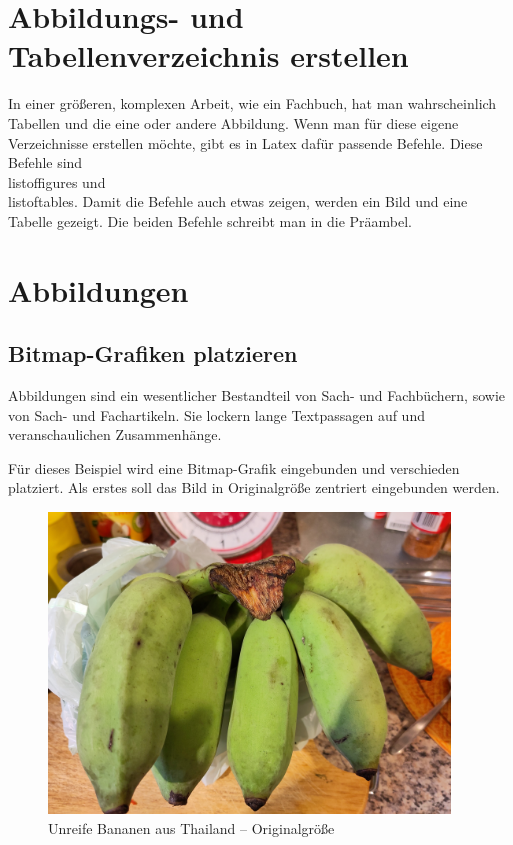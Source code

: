 \section{Abbildungs- und Tabellenverzeichnis erstellen}

In einer größeren, komplexen Arbeit, wie ein Fachbuch, hat man wahrscheinlich Tabellen und die eine oder andere Abbildung. Wenn man für diese eigene Verzeichnisse erstellen möchte, gibt es in Latex dafür passende Befehle. Diese Befehle sind \\listoffigures und \\listoftables. Damit die Befehle auch etwas zeigen, werden ein Bild und eine Tabelle gezeigt. Die beiden Befehle schreibt man in die Präambel.

\section{Abbildungen}

\subsection{Bitmap-Grafiken platzieren}

Abbildungen sind ein wesentlicher Bestandteil von Sach- und Fachbüchern, sowie von Sach- und Fachartikeln. Sie lockern lange Textpassagen auf und veranschaulichen Zusammenhänge.

Für dieses Beispiel wird eine Bitmap-Grafik eingebunden und verschieden platziert. Als erstes soll das Bild in Originalgröße zentriert eingebunden werden.

\begin{figure}[H]
	\centering
	\includegraphics[width=0.95\textwidth]{../images/ThaiBananen}
	\caption{Unreife Bananen aus Thailand -- Originalgröße}
	\label{fig:thai-bananen}
	\end{figure}
	
